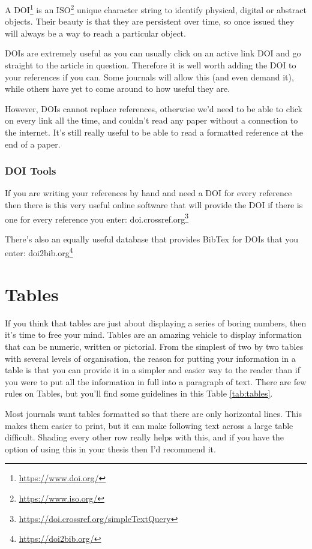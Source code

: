 \documentclass[
]{krantz}
\renewcommand{\href}[2]{#2\footnote{\url{#1}}}
\begin{document}
A \href{https://www.doi.org/}{DOI} is an \href{https://www.iso.org/}{ISO} unique character string to identify physical, digital or abstract objects. Their beauty is that they are persistent over time, so once issued they will always be a way to reach a particular object.

DOIs are extremely useful as you can usually click on an active link DOI and go straight to the article in question. Therefore it is well worth adding the DOI to your references if you can. Some journals will allow this (and even demand it), while others have yet to come around to how useful they are.

However, DOIs cannot replace references, otherwise we'd need to be able to click on every link all the time, and couldn't read any paper without a connection to the internet. It's still really useful to be able to read a formatted reference at the end of a paper.

\hypertarget{doi-tools}{%
\subsubsection{DOI Tools}\label{doi-tools}}

If you are writing your references by hand and need a DOI for every reference then there is this very useful online software that will provide the DOI if there is one for every reference you enter:
\href{https://doi.crossref.org/simpleTextQuery}{doi.crossref.org}

There's also an equally useful database that provides BibTex for DOIs that you enter: \href{https://doi2bib.org/}{doi2bib.org}

\hypertarget{tables}{%
\section{Tables}\label{tables}}

If you think that tables are just about displaying a series of boring numbers, then it's time to free your mind. Tables are an amazing vehicle to display information that can be numeric, written or pictorial. From the simplest of two by two tables with several levels of organisation, the reason for putting your information in a table is that you can provide it in a simpler and easier way to the reader than if you were to put all the information in full into a paragraph of text. There are few rules on Tables, but you'll find some guidelines in this Table \ref{tab:tables}.

Most journals want tables formatted so that there are only horizontal lines. This makes them easier to print, but it can make following text across a large table difficult. Shading every other row really helps with this, and if you have the option of using this in your thesis then I'd recommend it.
\end{document}
